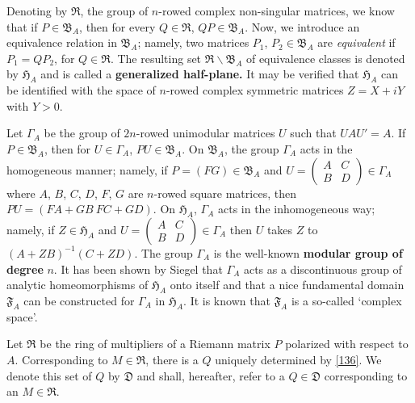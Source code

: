 Denoting by $\mathfrak{R}$, the group of $n$-rowed complex
non-singular matrices, we know that if $P\in \mathfrak{B}_{A}$, then
for every $Q\in\mathfrak{R}$, $QP\in\mathfrak{B}_{A}$. Now, we
introduce an equivalence relation in $\mathfrak{B}_{A}$; namely, two
matrices $P_{1}$, $P_{2}\in\mathfrak{B}_{A}$ are {\em equivalent} if
$P_{1}=QP_{2}$, for $Q\in\mathfrak{R}$. The resulting set
$\mathfrak{R}\backslash \mathfrak{B}_{A}$ of equivalence classes is
denoted by $\mathfrak{H}_{A}$ and is called a {\bf generalized
  half-plane.} It may be verified that $\mathfrak{H}_{A}$ can be
identified with the space of $n$-rowed complex symmetric matrices
$Z=X+iY$ with $Y>0$.

Let $\Gamma_{A}$ be the group of $2n$-rowed unimodular matrices $U$
such that $UAU'=A$. If $P\in\mathfrak{B}_{A}$, then for
$U\in\Gamma_{A}$, $PU\in\mathfrak{B}_{A}$. On $\mathfrak{B}_{A}$, the
group $\Gamma_{A}$ acts in the homogeneous manner; namely, if
$P=(FG)\in\mathfrak{B}_{A}$ and $U=\left(\begin{smallmatrix} A & C\\ B
  & D\end{smallmatrix}\right)\in \Gamma_{A}$ where $A$, $B$, $C$, $D$,
  $F$, $G$ are $n$-rowed square matrices, then $PU=(FA+GB\ FC+GD)$. On
  $\mathfrak{H}_{A}$, $\Gamma_{A}$ acts in the inhomogeneous way;
  namely, if $Z\in\mathfrak{H}_{A}$ and $U=\left(\begin{smallmatrix} A
    & C\\ B & D  \end{smallmatrix}\right)\in\Gamma_{A}$ then $U$ takes
  $Z$ to $(A+ZB)^{-1}(C+ZD)$. The group $\Gamma_{A}$ is the well-known
  {\bf modular group of degree} $n$. It has been shown by Siegel that
  $\Gamma_{A}$ acts as a discontinuous group of analytic
  homeomorphisms of $\mathfrak{H}_{A}$ onto itself and that a nice
  fundamental domain $\mathfrak{F}_{A}$ can be constructed for
  $\Gamma_{A}$ in $\mathfrak{H}_{A}$. It is known that
  $\mathfrak{F}_{A}$ is a so-called `complex space'.

Let $\mathfrak{R}$ be the ring of multipliers of a Riemann matrix $P$
polarized with respect to $A$. Corresponding to $M\in\mathfrak{R}$,
there is a $Q$ uniquely determined by \eqref{136}. We denote this set
of $Q$ by $\mathfrak{D}$ and shall, hereafter, refer to a
$Q\in\mathfrak{D}$ corresponding to an $M\in\mathfrak{R}$.

